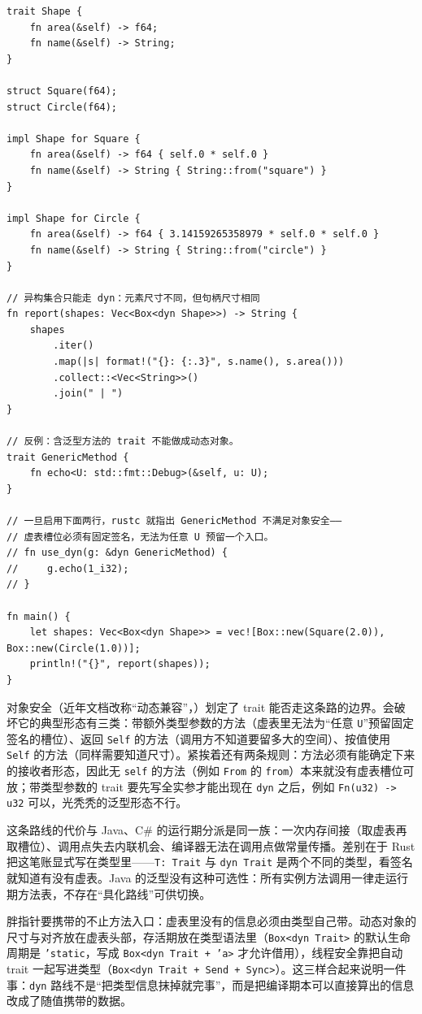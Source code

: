 \documentclass[12pt,a4paper,fontset=fandol]{ctexbook}
\newcommand{\kw}[1]{\texttt{#1}}
\newcommand{\seqkw}[1]{\seqsplit{\texttt{#1}}}
\begin{document}
\begin{lstlisting}[style=ruststyle,caption={dyn Trait 的用法，以及泛型方法如何破坏对象安全}]
trait Shape {
    fn area(&self) -> f64;
    fn name(&self) -> String;
}

struct Square(f64);
struct Circle(f64);

impl Shape for Square {
    fn area(&self) -> f64 { self.0 * self.0 }
    fn name(&self) -> String { String::from("square") }
}

impl Shape for Circle {
    fn area(&self) -> f64 { 3.14159265358979 * self.0 * self.0 }
    fn name(&self) -> String { String::from("circle") }
}

// 异构集合只能走 dyn：元素尺寸不同，但句柄尺寸相同
fn report(shapes: Vec<Box<dyn Shape>>) -> String {
    shapes
        .iter()
        .map(|s| format!("{}: {:.3}", s.name(), s.area()))
        .collect::<Vec<String>>()
        .join(" | ")
}

// 反例：含泛型方法的 trait 不能做成动态对象。
trait GenericMethod {
    fn echo<U: std::fmt::Debug>(&self, u: U);
}

// 一旦启用下面两行，rustc 就指出 GenericMethod 不满足对象安全——
// 虚表槽位必须有固定签名，无法为任意 U 预留一个入口。
// fn use_dyn(g: &dyn GenericMethod) {
//     g.echo(1_i32);
// }

fn main() {
    let shapes: Vec<Box<dyn Shape>> = vec![Box::new(Square(2.0)), Box::new(Circle(1.0))];
    println!("{}", report(shapes));
}
\end{lstlisting}

对象安全（近年文档改称“动态兼容”，\seqkw{object\allowbreak{} safety}）划定了 trait 能否走这条路的边界。会破坏它的典型形态有三类：带额外类型参数的方法（虚表里无法为“任意 \kw{U}”预留固定签名的槽位）、返回 \kw{Self} 的方法（调用方不知道要留多大的空间）、按值使用 \kw{Self} 的方法（同样需要知道尺寸）。紧挨着还有两条规则：方法必须有能确定下来的接收者形态，因此无 \kw{self} 的方法（例如 \kw{From} 的 \kw{from}）本来就没有虚表槽位可放；带类型参数的 trait 要先写全实参才能出现在 \kw{dyn} 之后，例如 \kw{Fn(u32) -> u32} 可以，光秃秃的泛型形态不行。

这条路线的代价与 Java、C\# 的运行期分派是同一族：一次内存间接（取虚表再取槽位）、调用点失去内联机会、编译器无法在调用点做常量传播。差别在于 Rust 把这笔账显式写在类型里——\kw{T: Trait} 与 \kw{dyn Trait} 是两个不同的类型，看签名就知道有没有虚表。Java 的泛型没有这种可选性：所有实例方法调用一律走运行期方法表，不存在“具化路线”可供切换。

胖指针要携带的不止方法入口：虚表里没有的信息必须由类型自己带。动态对象的尺寸与对齐放在虚表头部，存活期放在类型语法里（\kw{Box<dyn Trait>} 的默认生命周期是 \kw{'static}，写成 \kw{Box<dyn Trait + 'a>} 才允许借用），线程安全靠把自动 trait 一起写进类型（\kw{Box<dyn Trait + Send + Sync>}）。这三样合起来说明一件事：\kw{dyn} 路线不是“把类型信息抹掉就完事”，而是把编译期本可以直接算出的信息改成了随值携带的数据。
\end{document}
